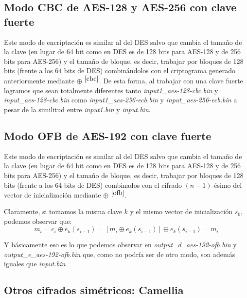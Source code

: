 \documentclass[a4paper, 11pt]{article}
\begin{document}
	\subsection{Modo CBC de AES-128 y AES-256 con clave fuerte}
		Este modo de encriptación es similar al del DES salvo que cambia el tamaño de la clave (en lugar de 64 bit como en
		DES es de 128 bits para AES-128 y de 256 bits para AES-256) y el tamaño de bloque, es decir, trabajar por bloques
		de 128 bits (frente a los 64 bits de DES) combinándolos con el criptograma generado anteriormente mediante $\oplus$
		$^{\ref{cbc}}$. De esta forma, al trabajar con una clave fuerte logramos que sean totalmente diferentes tanto
		\textit{input1\_aes-128-cbc.bin} y \textit{input\_aes-128-cbc.bin} como \textit{input1\_aes-256-ecb.bin} y
		\textit{input\_aes-256-ecb.bin} a pesar de la similitud entre \textit{input1.bin} y \textit{input.bin}.
		
	\subsection{Modo OFB de AES-192 con clave fuerte}
		Este modo de encriptación es similar al del DES salvo que cambia el tamaño de la clave (en lugar de 64 bit como en
		DES es de 128 bits para AES-128 y de 256 bits para AES-256) y el tamaño de bloque, es decir, trabajar por bloques
		de 128 bits (frente a los 64 bits de DES) combinados con el cifrado $(n-1)$-ésimo del vector de inicialización
		mediante $\oplus$ $^{\ref{ofb}}$.
		
		Claramente, si tomamos la misma clave $k$ y el mismo vector de inicialización $s_0$, podemos observar que:
		\[m_i = c_i \oplus e_k(s_{i-1}) = [m_i \oplus e_k(s_{i-1})] \oplus e_k(s_{i-1}) = m_i\]
		
		Y básicamente eso es lo que podemos observar en \textit{output\_d\_aes-192-ofb.bin} y \textit{output\_e\_aes-192-ofb.bin}
		que, como no podría ser de otro modo, son además iguales que \textit{input.bin}
		
	\subsection{Otros cifrados simétricos: Camellia}
		
	
\end{document}
